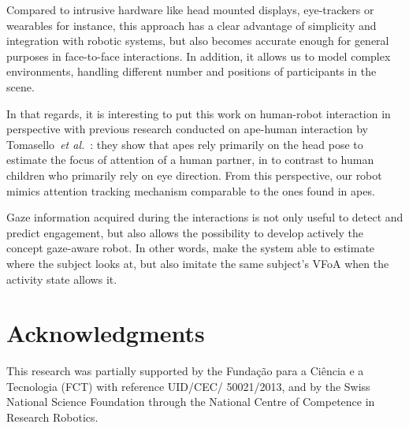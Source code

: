 \documentclass{sig-alternate}
\newcommand{\etal}{\textit{et al.}\xspace}
\begin{document}
Compared to intrusive hardware like head mounted
displays, eye-trackers or wearables for instance, this approach has a clear
advantage of simplicity and integration with robotic systems, but also becomes
accurate enough for general purposes in face-to-face interactions. In addition,
it allows us to model complex environments, handling different number and
positions of participants in the scene.

In that regards, it is interesting to put this work on human-robot interaction
in perspective with previous research conducted on ape-human interaction by
Tomasello~\etal~\cite{tomasello2007reliance}: they show that apes rely primarily
on the head pose to estimate the focus of attention of a human partner, in to contrast
to human children who primarily rely on eye direction. From this perspective,
our robot mimics attention tracking mechanism comparable to the ones found in apes.

Gaze information acquired during the interactions is not only useful to detect
and predict engagement, but also allows the possibility to develop actively the
concept gaze-aware robot. In other words, make the system able to estimate where
the subject looks at, but also imitate the same subject's VFoA when the activity
state allows it. 

\section*{Acknowledgments}

This research was partially supported by the Funda\c{c}\~{a}o para a Ci\^{e}ncia
e a Tecnologia (FCT) with reference UID/CEC/ 50021/2013, and by the Swiss
National Science Foundation through the National Centre of Competence in
Research Robotics.



\end{document}
